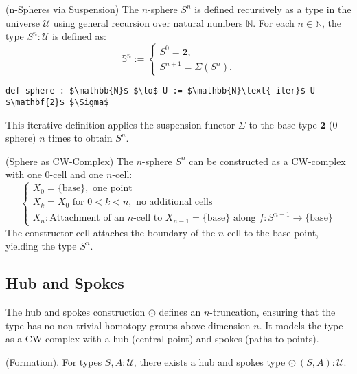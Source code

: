 \documentclass{article}
\begin{document}
\begin{definition} (n-Spheres via Suspension)
The \( n \)-sphere \( S^n \) is defined recursively as a type in
the universe \( \mathcal{U} \) using general recursion over natural
numbers \( \mathbb{N} \). For each \( n \in \mathbb{N} \),
the type \( S^n : \mathcal{U} \) is defined as:
\[
\mathbb{S}^n :=
\begin{cases}
S^0 = \mathbf{2}, \\
S^{n+1} = \Sigma(S^n).
\end{cases}
\]
\begin{lstlisting}[mathescape=true]
def sphere : $\mathbb{N}$ $\to$ U := $\mathbb{N}\text{-iter}$ U $\mathbf{2}$ $\Sigma$
\end{lstlisting}
This iterative definition applies the suspension functor \( \Sigma \)
to the base type \( \mathbf{2} \) (0-sphere) \( n \) times to obtain \( S^n \).
\end{definition}

\begin{example} (Sphere as CW-Complex)
The \( n \)-sphere \( S^n \) can be constructed as a CW-complex with
one 0-cell and one \( n \)-cell:
\[
\begin{cases}
X_0 = \{ \text{base} \}, \text{ one point} \\
X_k = X_0 \text{ for } 0 < k < n, \text{ no additional cells} \\
X_n: \text{Attachment of an } n\text{-cell to } X_{n-1} = \{ \text{base} \} \text{ along } f : S^{n-1} \to \{ \text{base} \}
\end{cases}
\]
The constructor \( \text{cell} \) attaches the boundary of the \( n \)-cell
to the base point, yielding the type \( S^n \).
\end{example}

\newpage
\subsection{Hub and Spokes}
The hub and spokes construction \( \odot \) defines an \( n \)-truncation,
ensuring that the type has no non-trivial homotopy groups above
dimension \( n \). It models the type as a CW-complex with
a hub (central point) and spokes (paths to points).

\begin{definition} (Formation).
For types \( S, A : \mathcal{U} \), there exists a hub and spokes type \( \odot\ (S,A) : \mathcal{U} \).
\end{definition}
\end{document}

